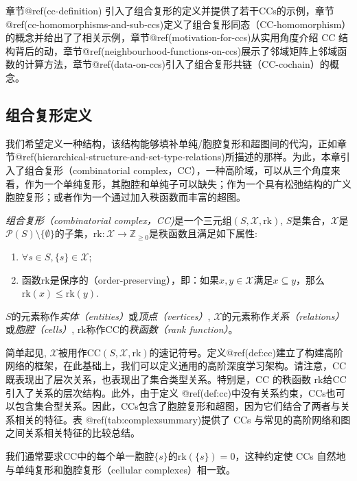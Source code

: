 \documentclass[
  12pt,
]{krantz}
\providecommand{\tightlist}{%
  \setlength{\itemsep}{0pt}\setlength{\parskip}{0pt}}
\begin{document}
章节@ref(cc-definition)
引入了组合复形的定义并提供了若干CCs的示例，章节@ref(cc-homomorphisms-and-sub-ccs)定义了组合复形同态（CC-homomorphism）的概念并给出了了相关示例，章节@ref(motivation-for-ccs)从实用角度介绍
CC
结构背后的动，章节@ref(neighbourhood-functions-on-ccs)展示了邻域矩阵上邻域函数的计算方法，章节@ref(data-on-ccs)引入了组合复形共链（CC-cochain）的概念。

\subsection{组合复形定义}\label{cc-definition}

我们希望定义一种结构，该结构能够填补单纯/胞腔复形和超图间的代沟，正如章节@ref(hierarchical-structure-and-set-type-relations)所描述的那样。为此，本章引入了组合复形（combinatorial
complex，CC），一种高阶域，可以从三个角度来看，作为一个单纯复形，其胞腔和单纯子可以缺失；作为一个具有松弛结构的广义胞腔复形；或者作为一个通过加入秩函数而丰富的超图。

\label{cc}
\emph{组合复形（combinatorial
complex，CC)}是一个三元组\((S,\mathcal{X},\mbox{rk})\),
\(S\)是集合，\(\mathcal{X}\)是\(\mathcal{P}(S)\setminus\{\emptyset\}\)的子集，\(\mbox{rk} \colon \mathcal{X}\to \mathbb{Z}_{\ge 0}\)是秩函数且满足如下属性:

\begin{enumerate}
\def\labelenumi{\arabic{enumi}.}
\tightlist
\item
  \(\forall s\in S, \{s\}\in\mathcal{X}\);
\item
  函数\(\mbox{rk}\)是保序的（order-preserving），即：如果\(x,y\in \mathcal{X}\)满足\(x\subseteq  y\)，那么\(\mbox{rk}(x) \leq \mbox{rk}(y)\).
\end{enumerate}

\(S\)的元素称作\emph{实体（entities）}或\emph{顶点（vertices）},
\(\mathcal{X}\)的元素称作\emph{关系（relations）}或\emph{胞腔（cells）},
\(\mbox{rk}\)称作CC的\emph{秩函数（rank function）}。

简单起见,
\(\mathcal{X}\)被用作CC\((S,\mathcal{X},\mbox{rk})\)的速记符号。定义@ref(def:cc)建立了构建高阶网络的框架，在此基础上，我们可以定义通用的高阶深度学习架构。请注意，CC既表现出了层次关系，也表现出了集合类型关系。特别是，CC
的秩函数 \(\mbox{rk}\)给CC引入了关系的层次结构。此外，由于定义
@ref(def:cc)中没有关系约束，CCs也可以包含集合型关系。因此，CCs包含了胞腔复形和超图，因为它们结合了两者与关系相关的特征。表
@ref(tab:complexsummary)提供了 CCs
与常见的高阶网络和图之间关系相关特征的比较总结。

我们通常要求CC中的每个单一胞腔\(\{s\}\)的\(\mbox{rk}(\{s\})=0\)，这种约定使
CCs 自然地与单纯复形和胞腔复形（cellular complexes）相一致。
\end{document}
